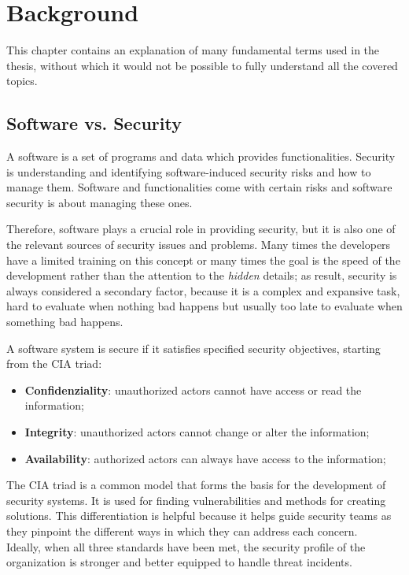 \chapter{Background}
\label{cha:background}


This chapter contains an explanation of many fundamental terms used in the thesis, without which it would not be possible to fully understand all the covered topics.

\section{Software vs. Security}

A software is a set of programs and data which provides functionalities. Security is understanding and identifying software-induced security risks and how to manage them. Software and functionalities come with certain risks and software security is about managing these ones.

Therefore, software plays a crucial role in providing security, but it is also one of the relevant sources of security issues and problems. Many times the developers have a limited training on this concept or many times the goal is the speed of the development rather than the attention to the \textit{hidden} details; as result, security is always considered a secondary factor, because it is a complex and expansive task, hard to evaluate when nothing bad happens but usually too late to evaluate when something bad happens.~\cite{st-slides}

A software system is secure if it satisfies specified security objectives, starting from the CIA triad:
\begin{itemize}
  \item \textbf{Confidenziality}: unauthorized actors cannot have access or read the information;
  \item \textbf{Integrity}: unauthorized actors cannot change or alter the information;
  \item \textbf{Availability}: authorized actors can always have access to the information;
\end{itemize}
The CIA triad is a common model that forms the basis for the development of security systems. It is used for finding vulnerabilities and methods for creating solutions. This differentiation is helpful because it helps guide security teams as they pinpoint the different ways in which they can address each concern.\\
Ideally, when all three standards have been met, the security profile of the organization is stronger and better equipped to handle threat incidents.~\cite{cia-triad}

